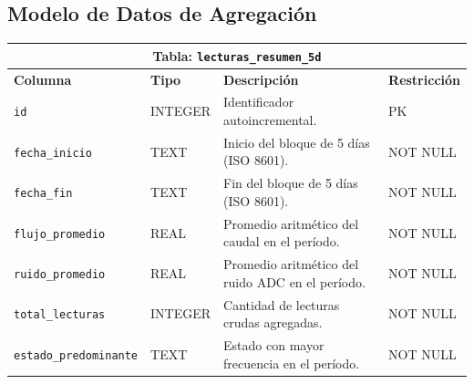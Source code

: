 \documentclass[12pt,a4paper]{article}
\begin{document}
\subsection{Modelo de Datos de Agregación}

\begin{center}
\begin{tabularx}{0.95\textwidth}{llXl}
    \toprule
    \multicolumn{4}{c}{\textbf{Tabla: \texttt{lecturas\_resumen\_5d}}} \\
    \midrule
    \textbf{Columna} & \textbf{Tipo} & \textbf{Descripción} & \textbf{Restricción} \\
    \midrule
    \texttt{id}                  & INTEGER & Identificador autoincremental.                   & PK \\
    \texttt{fecha\_inicio}       & TEXT    & Inicio del bloque de 5 días (ISO 8601).          & NOT NULL \\
    \texttt{fecha\_fin}          & TEXT    & Fin del bloque de 5 días (ISO 8601).             & NOT NULL \\
    \texttt{flujo\_promedio}     & REAL    & Promedio aritmético del caudal en el período.    & NOT NULL \\
    \texttt{ruido\_promedio}     & REAL    & Promedio aritmético del ruido ADC en el período. & NOT NULL \\
    \texttt{total\_lecturas}     & INTEGER & Cantidad de lecturas crudas agregadas.            & NOT NULL \\
    \texttt{estado\_predominante}& TEXT    & Estado con mayor frecuencia en el período.        & NOT NULL \\
    \bottomrule
\end{tabularx}
\vspace{0.5em}


\end{center}
\end{document}
